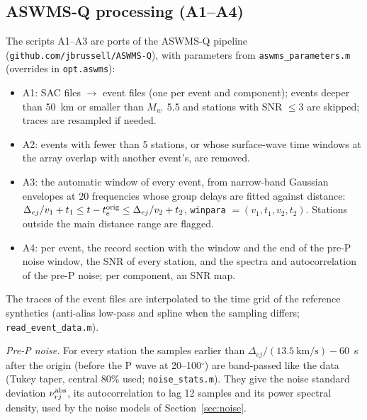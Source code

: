 \documentclass[11pt]{article}
\begin{document}
\subsection{ASWMS-Q processing (A1--A4)}\label{sec:aswms}
The scripts A1--A3 are ports of the ASWMS-Q pipeline
(\texttt{github.com/jbrussell/ASWMS-Q}), with parameters from
\texttt{aswms\_parameters.m} (overrides in \texttt{opt.aswms}):
\begin{itemize}
\item A1: SAC files $\to$ event files (one per event and component);
  events deeper than 50~km or smaller than $M_w$~5.5 and stations with
  SNR $\le3$ are skipped; traces are resampled if needed.
\item A2: events with fewer than 5 stations, or whose surface-wave time
  windows at the array overlap with another event's, are removed.
\item A3: the automatic window of every event, from narrow-band Gaussian
  envelopes at 20 frequencies whose group delays are fitted against
  distance: $\Delta_{ej}/v_1+t_1\le t-t_e^{\rm orig}\le\Delta_{ej}/v_2+t_2$,
  \texttt{winpara} $=(v_1,t_1,v_2,t_2)$. Stations outside the main
  distance range are flagged.
\item A4: per event, the record section with the window and the end of the
  pre-P noise window, the SNR of every station, and the spectra and
  autocorrelation of the pre-P noise; per component, an SNR map.
\end{itemize}
The traces of the event files are interpolated to the time grid of the
reference synthetics (anti-alias low-pass and spline when the sampling
differs; \texttt{read\_event\_data.m}).

\emph{Pre-P noise.} For every station the samples earlier than
$\Delta_{ej}/(13.5~\text{km/s})-60$~s after the origin (before the P wave at
20--100$^\circ$) are band-passed like the data (Tukey taper, central 80\%
used; \texttt{noise\_stats.m}). They give the noise standard deviation
$\nu^{\rm abs}_{rj}$, its autocorrelation to lag 12 samples and its power
spectral density, used by the noise models of Section~\ref{sec:noise}.
\end{document}
